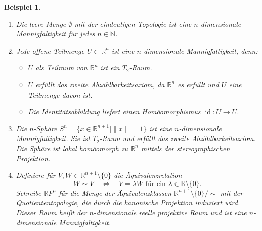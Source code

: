 \documentclass[a4paper,12pt]{article}
\theoremstyle{break}
\newtheorem{example}[definition]{Beispiel}
\begin{document}
\begin{example}
\begin{enumerate}
    Beispiele für n-dimensionale Mannigfaltigkeiten sind:
    \item Die leere Menge $\emptyset$ mit der eindeutigen Topologie ist eine $n$-dimensionale Mannigfaltigkeit für jedes $n \in \mathbb{N}$.
    
    \item Jede offene Teilmenge $U \subset \mathbb{R}^n$ ist eine $n$-dimensionale Mannigfaltigkeit, denn:
    \begin{itemize}
        \item $U$ als Teilraum von $\mathbb{R}^n$ ist ein $T_2$-Raum.
        \item $U$ erfüllt das zweite Abzählbarkeitsaxiom, da $\mathbb{R}^n$ es erfüllt und $U$ eine Teilmenge davon ist.
        \item Die Identitätsabbildung liefert einen Homöomorphismus $\operatorname{id}: U \to U$.
    \end{itemize}

    \item Die $n$-Sphäre $S^n = \{x \in \mathbb{R}^{n+1} \mid \|x\| = 1\}$ ist eine $n$-dimensionale Mannigfaltigkeit. Sie ist $T_2$-Raum und erfüllt das zweite Abzählbarkeitsaxiom. Die Sphäre ist lokal homöomorph zu $\mathbb{R}^n$ mittels der \emph{stereographischen Projektion}.
    
    \item Definiere für $V, W \in \mathbb{R}^{n+1} \setminus \{0\}$ die Äquivalenzrelation
    \[
    W \sim V \quad \iff \quad V = \lambda W \text{ für ein } \lambda \in \mathbb{R} \setminus \{0\}.
    \]
    Schreibe $\mathbb{R}P^n$ für die Menge der Äquivalenzklassen $\mathbb{R}^{n+1} \setminus \{0\} / \sim$ mit der Quotiententopologie, die durch die kanonische Projektion induziert wird. Dieser Raum heißt der \emph{$n$-dimensionale reelle projektive Raum} und ist eine $n$-dimensionale Mannigfaltigkeit.
\end{enumerate}
\end{example}
\end{document}
